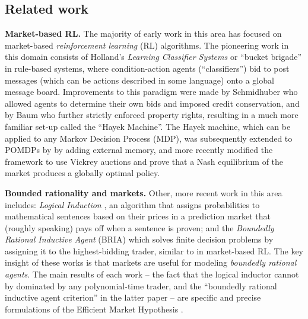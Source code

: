 \subsection{Related work}
\label{mba/sec:related}

\textbf{Market-based RL.} The majority of early work in this area has focused on market-based \emph{reinforcement learning} (RL) algorithms. The pioneering work in this domain consists of Holland's \emph{Learning Classifier Systems} or ``bucket brigade'' \citep{hollandPropertiesBucketBrigade1985a} in rule-based systems, where condition-action agents (``classifiers'') bid to post messages (which can be actions described in some language) onto a global message board. Improvements to this paradigm were made by Schmidhuber \citep{schmidhuberEvolutionaryPrinciplesSelfreferential1987, schmidhuberLocalLearningAlgorithm1989} who allowed agents to determine their own bids and imposed credit conservation, and by Baum \citep{baumModelIntelligenceEconomy1999} who further strictly enforced property rights, resulting in a much more familiar set-up called the ``Hayek Machine''. The Hayek machine, which can be applied to any Markov Decision Process (MDP), was subsequently extended to POMDPs by \citet{kweeMarketBasedReinforcementLearning2001} by adding external memory, and more recently \citep{changDecentralizedReinforcementLearning2020} modified the framework to use Vickrey auctions and prove that a Nash equilibrium of the market produces a globally optimal policy.

\textbf{Bounded rationality and markets.} Other, more recent work in this area includes: \emph{Logical Induction} \citep{garrabrantLogicalInduction2020}, an algorithm that assigns probabilities to mathematical sentences based on their prices in a prediction market that (roughly speaking) pays off when a sentence is proven; and the \emph{Boundedly Rational Inductive Agent} (BRIA) \citep{oesterheldTheoryBoundedInductive2023} which solves finite decision problems by assigning it to the highest-bidding trader, similar to in market-based RL. The key insight of these works is that markets are useful for modeling \emph{boundedly rational agents}. The main results of each work -- the fact that the logical inductor cannot by dominated by any polynomial-time trader, and the ``boundedly rational inductive agent criterion'' in the latter paper -- are specific and precise formulations of the Efficient Market Hypothesis \citep{neymanAlgorithmicBayesianEpistemology2024}.

